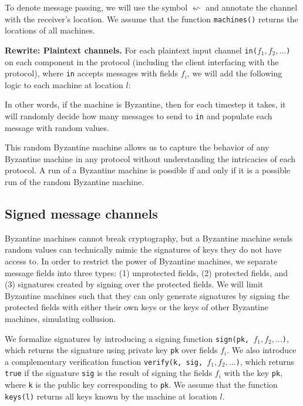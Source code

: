 To denote message passing, we will use the symbol $\leftsquigarrow$ and annotate the channel with the receiver's location.
We assume that the function \texttt{machines()} returns the locations of all machines.

\textbf{Rewrite: Plaintext channels.} For each plaintext input channel \texttt{in($f_1, f_2, \ldots$)} on each component in the protocol (including the client interfacing with the protocol), where \texttt{in} accepts messages with fields $f_i$, we will add the following logic to each machine at location $l$:
\begin{algorithmic}
        \EndFor
    \EndFor
\EndIf
\end{algorithmic}

In other words, if the machine is Byzantine, then for each timestep it takes, it will randomly decide how many messages to send to \texttt{in} and populate each message with random values.

This random Byzantine machine allows us to capture the behavior of any Byzantine machine in any protocol without understanding the intricacies of each protocol.
A run of a Byzantine machine is possible if and only if it is a possible run of the random Byzantine machine.

\subsection{Signed message channels}
\label{sec:signed-channels-formalism}
Byzantine machines cannot break cryptography, but a Byzantine machine sends random values can technically mimic the signatures of keys they do not have access to.
In order to restrict the power of Byzantine machines, we separate message fields into three types:
(1) unprotected fields,
(2) protected fields, and
(3) signatures created by signing over the protected fields.
We will limit Byzantine machines such that they can only generate signatures by signing the protected fields with either their own keys or the keys of other Byzantine machines, simulating collusion.

We formalize signatures by introducing a signing function \texttt{sign(pk, $f_1, f_2, \ldots$)}, which returns the signature using private key \texttt{pk} over fields $f_i$.
We also introduce a complementary verification function \texttt{verify(k, sig, $f_1, f_2, \ldots$)}, which returns \texttt{true} if the signature \texttt{sig} is the result of signing the fields $f_i$ with the key \texttt{pk}, where \texttt{k} is the public key corresponding to \texttt{pk}.
We assume that the function \texttt{keys(l)} returns all keys known by the machine at location $l$.

